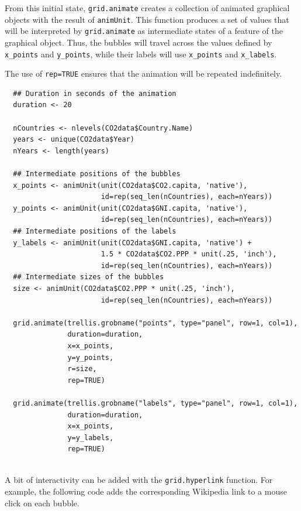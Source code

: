 \documentclass[smallroyalvopaper]{memoir}
\begin{document}
From this initial state, \texttt{grid.animate} creates a collection of
animated graphical objects with the result of \texttt{animUnit}. This
function produces a set of values that will be interpreted by
\texttt{grid.animate} as intermediate states of a feature of the graphical
object. Thus, the bubbles will travel across the values defined by
\texttt{x\_points} and \texttt{y\_points}, while their labels will use \texttt{x\_points} and
\texttt{x\_labels}.

The use of \texttt{rep=TRUE} ensures that the animation will be repeated
indefinitely.


\lstset{language=r,label= ,caption= ,captionpos=b,numbers=none}
\begin{lstlisting}
  ## Duration in seconds of the animation
  duration <- 20
  
  nCountries <- nlevels(CO2data$Country.Name)
  years <- unique(CO2data$Year)
  nYears <- length(years)
  
  ## Intermediate positions of the bubbles
  x_points <- animUnit(unit(CO2data$CO2.capita, 'native'),
                       id=rep(seq_len(nCountries), each=nYears))
  y_points <- animUnit(unit(CO2data$GNI.capita, 'native'),
                       id=rep(seq_len(nCountries), each=nYears))
  ## Intermediate positions of the labels
  y_labels <- animUnit(unit(CO2data$GNI.capita, 'native') +
                       1.5 * CO2data$CO2.PPP * unit(.25, 'inch'),
                       id=rep(seq_len(nCountries), each=nYears))
  ## Intermediate sizes of the bubbles
  size <- animUnit(CO2data$CO2.PPP * unit(.25, 'inch'),
                       id=rep(seq_len(nCountries), each=nYears))
  
  grid.animate(trellis.grobname("points", type="panel", row=1, col=1),
               duration=duration,
               x=x_points,
               y=y_points,
               r=size,
               rep=TRUE)
  
  grid.animate(trellis.grobname("labels", type="panel", row=1, col=1),
               duration=duration,
               x=x_points,
               y=y_labels,
               rep=TRUE)
  
\end{lstlisting}

A bit of interactivity can be added with the \texttt{grid.hyperlink}
function. For example, the following code adds the corresponding
Wikipedia link to a mouse click on each bubble.
\end{document}
